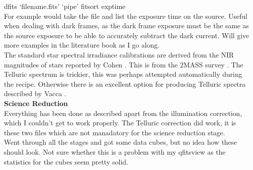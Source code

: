 \documentclass{literature}
\begin{document}
dfits `filename.fits' `pipe' fitsort exptime \\ 

For example would take the file and list the exposure time on the source. Useful when dealing with dark frames, as the dark frame exposure must be the same as the source exposure to be able to accurately subtract the dark current. Will give more examples in the literature book as I go along. \\ 
The standard star spectral irradiance calibrations are derived from the NIR magnitudes of stars reported by Cohen \citep{Cohen2003}. This is from the 2MASS survey \citep{Skrutskie_2006}. The Telluric spectrum is trickier, this was perhaps attempted automatically during the recipe. Otherwise there is an excellent option for producing Telluric spectra described by Vacca \citep{Vacca2003}. \\ 
\textbf{Science Reduction} \\ 
Everything has been done as described apart from the illumination correction, which I couldn't get to work properly. The Telluric correction did work, it is these two files which are not manadatory for the science reduction stage. \\ 
Went through all the stages and got some data cubes, but no idea how these should look. Not sure whether this is a problem with my qfitsview as the statistics for the cubes seem pretty solid. 
\end{document}
